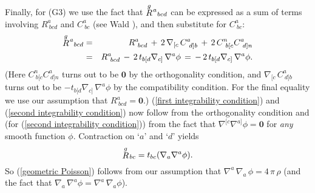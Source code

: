 \documentclass [12] {article}
\theoremstyle{plain}
\numberwithin{figure}{subsection}
\numberwithin{proposition}{subsection}
\begin{document}
{Finally, for (G3) we use the fact that  $\stackrel{g}{R}{}\hspace{-.2em}^a{}_{bcd}$ can be expressed as a sum of terms involving $R^a_{\ bcd}$ and $C^a_{\ bc}$ (see Wald ), and then substitute for $C^a_{\ bc}$: 
\begin{eqnarray*}
\stackrel{g}{R}{}\hspace{-.2em}^a{}_{bcd} &=&  R^a_{\ bcd}  \, + \, 2 \,  \nabla_{[c} \, C^a_{\  d]b} \, + \, 2 \,   C^n_{\  b[c}  C^a_{\  d]n}  \nonumber \\
{}&=&  R^a_{\ bcd}  \, - \, 2 \,  t_{b[d}  \nabla_{c]} \,  \nabla^a \phi  \, = \, - \, 2 \, t_{b[d}  \nabla_{c]} \,  \nabla^a \phi . 
\end{eqnarray*}
(Here $C^n_{\  b[c}  C^a_{\  d]n}$ turns out to be $\mathbf{0}$ by the orthogonality condition, and  $\nabla_{[c} \, C^a_{\  d]b}$ turns out to be $- t_{b[d}  \nabla_{c]} \,  \nabla^a \phi$ by the compatibility condition. For the final equality we use our assumption that  $R^a_{\ bcd} = \mathbf{0}$.) (\ref{first integrability condition})  and (\ref{second integrability condition}) now follow from  the orthogonality condition and (for (\ref{second integrability condition})) from the fact that $\nabla^{[c} \nabla^{a]} \phi  = \mathbf{0}$ for \emph{any} smooth function $\phi$. Contraction on `$a$' and `$d$' yields  
\begin{equation*}
\stackrel{g}{R}{}\hspace{-.2em}_{bc} =    t_{bc}  (\nabla_{a}  \nabla^a \phi).    
\end{equation*}
So (\ref{geometric Poisson}) follows from our assumption that $\nabla^a \, \nabla_a  \, \phi  =  4  \, \pi  \, \rho$ (and the fact that $\nabla_a \,  \nabla^a \phi = \nabla^a \,  \nabla_a \phi$).}


 

\end{document}
